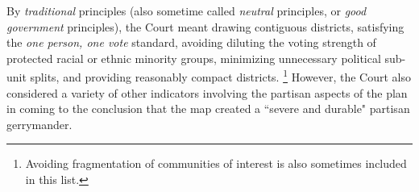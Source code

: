     By \textit{traditional} principles (also sometime called \textit{neutral} principles, or \textit{good government} principles), the Court meant drawing contiguous districts, satisfying the \textit{one person, one vote} standard, avoiding diluting the voting strength of protected racial or ethnic minority groups, minimizing unnecessary political sub-unit splits, and providing reasonably compact districts.
        \footnote{Avoiding fragmentation of communities of interest is also sometimes included in this list.}
    However, the Court also considered a variety of other indicators involving the partisan aspects of the plan in coming to the conclusion that the map created a ``severe and durable" partisan gerrymander.
